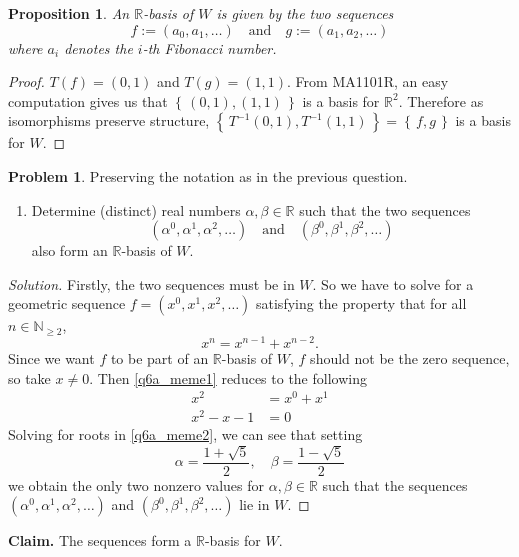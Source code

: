 \documentclass[11pt]{article}
\newtheorem*{proposition}{Proposition}
\theoremstyle{definition}
\newtheorem{problem}{Problem}
\numberwithin{lemma}{problem}
\numberwithin{equation}{problem}
\newenvironment{solution}{
    \renewcommand{\qedsymbol}{$\blacksquare$}
    \begin{proof}[Solution]
    }
    {
    \end{proof}
}
\newcommand{\N}{\mathbb{N}}
\newcommand{\R}{\mathbb{R}}
\newcommand{\set}[1]{\left\{\,#1\,\right\}}
\renewcommand{\geq}{\geqslant}
\begin{document}
\begin{proposition}
    An $\R$-basis of $W$ is given by the two sequences
        \[ f := (a_0, a_1, \dots) \quad\text{and}\quad g := (a_1, a_2, \dots) \]
    where $a_i$ denotes the $i$-th Fibonacci number.
\end{proposition}
\begin{proof}
    $T(f) = (0,1)$ and $T(g) = (1,1)$.
    From MA1101R, an easy computation gives us that
    $\set{(0,1),(1,1)}$ is a basis for $\R^2$.
    Therefore as isomorphisms preserve structure,
    $\set{ T^{-1}(0,1), T^{-1}(1,1) } = \set{f,g}$ is a basis for $W$.
\end{proof}

\newpage
\begin{problem}
    Preserving the notation as in the previous question.
    \begin{enumerate}[label=(\alph*)]
        \item Determine (distinct) real numbers $\alpha,\beta \in \R$ such that the two sequences
            \[
                (\alpha^0,\alpha^1,\alpha^2,\dots)\quad \text{and}\quad
                (\beta^0,\beta^1,\beta^2,\dots)
            \]
            also form an $\R$-basis of $W$.
    \end{enumerate}
\end{problem}
\begin{solution}
    Firstly, the two sequences must be in $W$.
    So we have to solve for a geometric sequence $f = (x^0, x^1, x^2, \dots)$
    satisfying the property that for all $n\in\N_{\geq 2}$,
    \begin{equation} \label{q6a_meme1}
        x^n = x^{n-1} + x^{n-2}.
    \end{equation}
    Since we want $f$ to be part of an $\R$-basis of $W$, $f$ should not be the zero sequence,
    so take $x\ne 0$. Then \eqref{q6a_meme1} reduces to the following
    \begin{align}
        x^2 &= x^0 + x^1    \nonumber \\
        x^2 - x - 1 &= 0    \label{q6a_meme2}
    \end{align}
    Solving for roots in \eqref{q6a_meme2}, we can see that setting
    \[
        \alpha = \frac{1+\sqrt{5}}{2},\quad
        \beta=\frac{1-\sqrt{5}}{2}
    \] we obtain the only two nonzero values for $\alpha,\beta\in\R$ such that
    the sequences $(\alpha^0,\alpha^1,\alpha^2,\dots)$ and
    $(\beta^0,\beta^1,\beta^2,\dots)$ lie in $W$.
\end{solution}
\textbf{Claim.} The sequences form a $\R$-basis for $W$.
\end{document}
